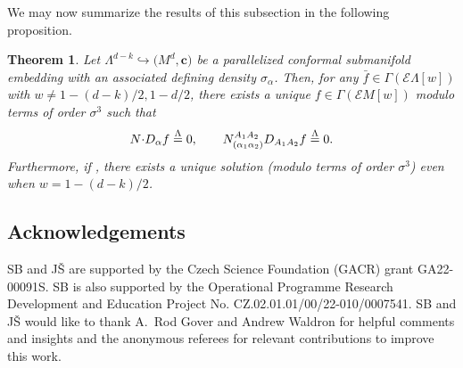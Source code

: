 \documentclass[pdftex]{sigma}
\numberwithin{equation}{section}
\newtheorem{Theorem}{Theorem}[section]
\newcommand{\ce}{\mathcal{E}}
\newcommand{\cc}{\boldsymbol{c}}
\renewcommand{\=}{\stackrel \Lambda =}
\newcommand{\csdot}{\hspace{-0.75mm} \cdot \hspace{-0.75mm}}
\begin{document}
We may now summarize the results of this subsection in the following proposition.
\begin{Theorem} \label{conformal-ext-solution}
Let $\Lambda^{d-k} \hookrightarrow \bigl(M^d,\cc\bigr)$ be a parallelized conformal submanifold embedding with an associated defining density $\sigma_{\alpha}$.
Then, for any $\bar{f} \in \Gamma(\ce \Lambda[w])$ with $w \neq 1 - (d-k)/2, 1-d/2$, there exists a unique $f \in \Gamma(\ce M[w])$ modulo terms of order $\sigma^3$ such that
\[N \csdot D_{\alpha} f \= 0 , \qquad N^{A_1 A_2}_{(\alpha_1 \alpha_2)} D_{A_1 A_2} f \= 0 .\]
Furthermore, if \smash{$P_2^\top \bar{f} \= 0$}, there exists a unique solution \big(modulo terms of order $\sigma^3$\big) even when $w = 1- (d-k)/2$.
\end{Theorem}

\subsection*{Acknowledgements}

SB and J\v{S} are supported by the Czech Science Foundation (GACR) grant GA22-00091S. SB is also supported by the Operational Programme Research Development and Education Project No. CZ.02.01.01/00/22-010/0007541. SB and J\v{S} would like to thank A.~Rod Gover and Andrew Waldron for helpful comments and insights and the anonymous referees for relevant contributions to improve this work.
\end{document}
